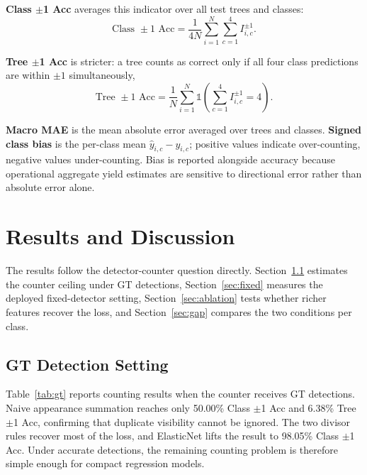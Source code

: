 \documentclass[conference]{IEEEtran}
\begin{document}
\textbf{Class $\pm$1 Acc} averages this indicator over all test trees and
classes:
\begin{equation}
  \text{Class } \pm 1 \text{ Acc} =
    \frac{1}{4N}\sum_{i=1}^{N}\sum_{c=1}^{4} I_{i,c}^{\pm 1}.
\end{equation}

\textbf{Tree $\pm$1 Acc} is stricter: a tree counts as correct only if all
four class predictions are within $\pm 1$ simultaneously,
\begin{equation}
  \text{Tree } \pm 1 \text{ Acc} =
    \frac{1}{N}\sum_{i=1}^{N}
      \mathbb{1}\!\left(\sum_{c=1}^{4} I_{i,c}^{\pm 1} = 4\right).
\end{equation}

\textbf{Macro MAE} is the mean absolute error averaged over trees and classes.
\textbf{Signed class bias} is the per-class mean $\hat{y}_{i,c} - y_{i,c}$;
positive values indicate over-counting, negative values under-counting. Bias
is reported alongside accuracy because operational aggregate yield estimates
are sensitive to directional error rather than absolute error alone.

\section{Results and Discussion}

The results follow the detector-counter question directly. Section~\ref{sec:gt}
estimates the counter ceiling under GT detections, Section~\ref{sec:fixed}
measures the deployed fixed-detector setting, Section~\ref{sec:ablation} tests
whether richer features recover the loss, and Section~\ref{sec:gap} compares
the two conditions per class.

\subsection{GT Detection Setting}
\label{sec:gt}

Table~\ref{tab:gt} reports counting results when the counter receives GT
detections. Naive appearance summation reaches only 50.00\% Class $\pm$1 Acc
and 6.38\% Tree $\pm$1 Acc, confirming that duplicate visibility cannot be
ignored. The two divisor rules recover most of the loss, and ElasticNet lifts
the result to 98.05\% Class $\pm$1 Acc. Under accurate detections, the remaining
counting problem is therefore simple enough for compact regression models.
\end{document}
